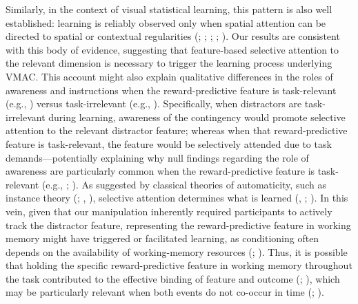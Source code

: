 \documentclass[
  man,
  floatsintext,
  longtable,
  nolmodern,
  notxfonts,
  notimes,
  mask,
  colorlinks=true,linkcolor=blue,citecolor=blue,urlcolor=blue]{apa7}
\begin{document}
Similarly, in the context of visual statistical learning, this pattern
is also well established: learning is reliably observed only when
spatial attention can be directed to spatial or contextual regularities
(;
;
;
;
). Our results are
consistent with this body of evidence, suggesting that feature-based
selective attention to the relevant dimension is necessary to trigger
the learning process underlying VMAC. This account might also explain
qualitative differences in the roles of awareness and instructions when
the reward-predictive feature is task-relevant (e.g.,
) versus
task-irrelevant (e.g., ). Specifically, when distractors are task-irrelevant during
learning, awareness of the contingency would promote selective attention
to the relevant distractor feature; whereas when that reward-predictive
feature is task-relevant, the feature would be selectively attended due
to task demands---potentially explaining why null findings regarding the
role of awareness are particularly common when the reward-predictive
feature is task-relevant (e.g., ; ). As
suggested by classical theories of automaticity, such as instance theory
(;
, ),
selective attention determines what is learned
(,
; ). In this vein, given that our manipulation inherently
required participants to actively track the distractor feature,
representing the reward-predictive feature in working memory might have
triggered or facilitated learning, as conditioning often depends on the
availability of working-memory resources
(;
). Thus, it is possible
that holding the specific reward-predictive feature in working memory
throughout the task contributed to the effective binding of feature and
outcome (;
), which may be
particularly relevant when both events do not co-occur in time
(;
).
\end{document}
